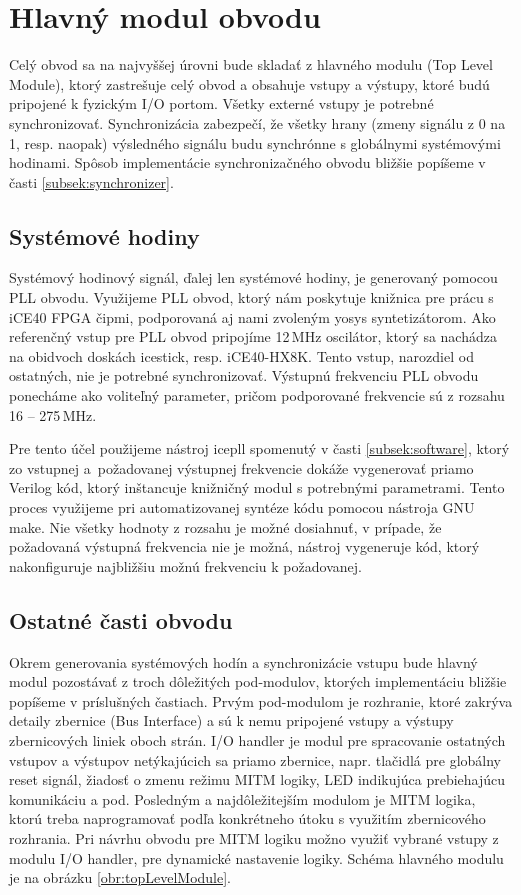 \section{Hlavný modul obvodu}\label{sek:topLevelModule}
Celý obvod sa na najvyššej úrovni bude skladať z hlavného modulu (Top Level Module), ktorý zastrešuje celý obvod a obsahuje vstupy a výstupy, ktoré budú pripojené k fyzickým I/O portom. Všetky externé vstupy je potrebné synchronizovať. Synchronizácia zabezpečí, že všetky hrany (zmeny signálu z 0 na 1, resp. naopak) výsledného signálu budu synchrónne s globálnymi systémovými hodinami. Spôsob implementácie synchronizačného obvodu bližšie popíšeme v časti \ref{subsek:synchronizer}.

\subsection{Systémové hodiny}
Systémový hodinový signál, ďalej len systémové hodiny, je generovaný pomocou PLL obvodu. Využijeme PLL obvod, ktorý nám poskytuje knižnica pre prácu s iCE40 FPGA čipmi, podporovaná aj nami zvoleným yosys syntetizátorom. Ako referenčný vstup pre PLL obvod pripojíme 12\,MHz oscilátor, ktorý sa nachádza na obidvoch doskách icestick, resp. iCE40-HX8K. Tento vstup, narozdiel od ostatných, nie je potrebné synchronizovať. Výstupnú frekvenciu PLL obvodu ponecháme ako voliteľný parameter, pričom podporované frekvencie sú z rozsahu 16 -- 275\,MHz.

Pre tento účel použijeme nástroj icepll spomenutý v časti \ref{subsek:software}, ktorý zo vstupnej a~požadovanej výstupnej frekvencie dokáže vygenerovať priamo Verilog kód, ktorý inštancuje knižničný modul s potrebnými parametrami.
Tento proces využijeme pri automatizovanej syntéze kódu pomocou nástroja GNU make. Nie všetky hodnoty z rozsahu je možné dosiahnuť, v prípade, že požadovaná výstupná frekvencia nie je možná, nástroj vygeneruje kód, ktorý nakonfiguruje najbližšiu možnú frekvenciu k požadovanej.

\subsection{Ostatné časti obvodu}
Okrem generovania systémových hodín a synchronizácie vstupu bude hlavný modul pozostávať z troch dôležitých pod-modulov, ktorých implementáciu bližšie popíšeme v príslušných častiach. Prvým pod-modulom je rozhranie, ktoré zakrýva detaily zbernice (Bus Interface) a sú k nemu pripojené vstupy a výstupy zbernicových liniek oboch strán. I/O handler je modul pre spracovanie ostatných vstupov a výstupov netýkajúcich sa priamo zbernice, napr. tlačidlá pre globálny reset signál, žiadosť o zmenu režimu MITM logiky, LED indikujúca prebiehajúcu komunikáciu a pod. Posledným a najdôležitejším modulom je MITM logika, ktorú treba naprogramovať podľa konkrétneho útoku s využitím zbernicového rozhrania. Pri návrhu obvodu pre MITM logiku možno využiť vybrané vstupy z modulu I/O handler, pre dynamické nastavenie logiky. Schéma hlavného modulu je na obrázku \ref{obr:topLevelModule}.

